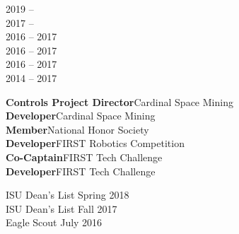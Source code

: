 \documentclass[9pt]{developercv} %
\begin{document}

\begin{minipage}[t]{0.16\textwidth}
	\vspace{-\baselineskip} %

	
	2019 -- \\
	2017 -- \\
	2016 -- 2017 \\
	2016 -- 2017 \\
	2016 -- 2017 \\
	2014 -- 2017 \\

\end{minipage}
\hfill
\begin{minipage}[t]{0.5\textwidth}
	\vspace{-\baselineskip} %
	
	\vspace{13mm}

	\textbf{Controls Project Director}\hfill Cardinal Space Mining \\
	\textbf{Developer}\hfill Cardinal Space Mining \\
	\textbf{Member}\hfill National Honor Society \\
	\textbf{Developer}\hfill FIRST Robotics Competition \\
	\textbf{Co-Captain}\hfill FIRST Tech Challenge \\
	\textbf{Developer}\hfill FIRST Tech Challenge \\
\end{minipage}
\hfill
\begin{minipage}[t]{0.32\textwidth}
	\vspace{-\baselineskip} %


	ISU Dean's List \hfill Spring 2018 \\
	ISU Dean's List \hfill Fall 2017 \\
	Eagle Scout \hfill July 2016 \\

\end{minipage}

\end{document}
